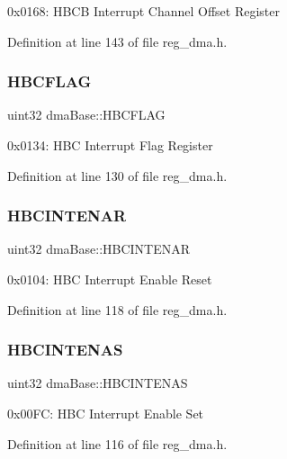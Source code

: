 0x0168\+: H\+B\+CB Interrupt Channel Offset Register 

Definition at line 143 of file reg\+\_\+dma.\+h.

\mbox{\label{structdmaBase_a8f15d3e307f0196f1dce3a8a03799d7f}} 
\subsubsection{\texorpdfstring{H\+B\+C\+F\+L\+AG}{HBCFLAG}}
{\footnotesize\ttfamily uint32 dma\+Base\+::\+H\+B\+C\+F\+L\+AG}

0x0134\+: H\+BC Interrupt Flag Register 

Definition at line 130 of file reg\+\_\+dma.\+h.

\mbox{\label{structdmaBase_abce6e86c62b71c5a6c02cf6049a4e731}} 
\subsubsection{\texorpdfstring{H\+B\+C\+I\+N\+T\+E\+N\+AR}{HBCINTENAR}}
{\footnotesize\ttfamily uint32 dma\+Base\+::\+H\+B\+C\+I\+N\+T\+E\+N\+AR}

0x0104\+: H\+BC Interrupt Enable Reset 

Definition at line 118 of file reg\+\_\+dma.\+h.

\mbox{\label{structdmaBase_a54a3a136b7434241ecc1e85c08114549}} 
\subsubsection{\texorpdfstring{H\+B\+C\+I\+N\+T\+E\+N\+AS}{HBCINTENAS}}
{\footnotesize\ttfamily uint32 dma\+Base\+::\+H\+B\+C\+I\+N\+T\+E\+N\+AS}

0x00\+FC\+: H\+BC Interrupt Enable Set 

Definition at line 116 of file reg\+\_\+dma.\+h.

\mbox{\label{structdmaBase_ae56d36731c1b6f8c74738f8e767787da}} 
